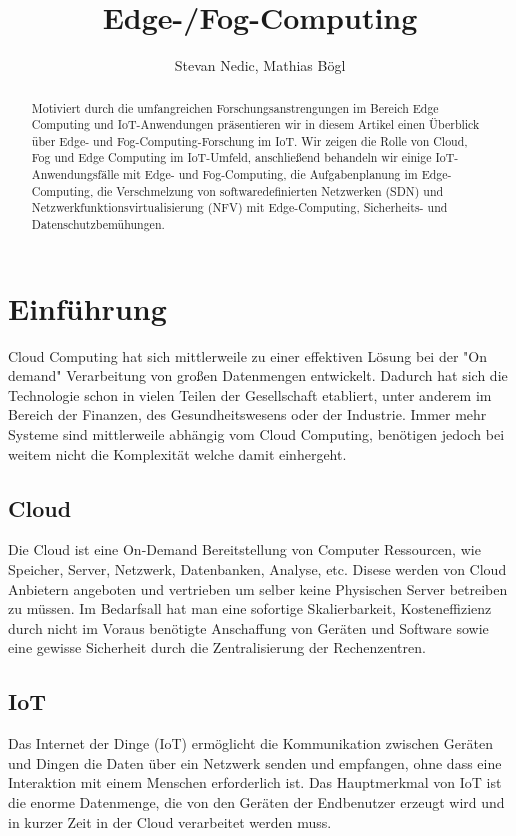 \documentclass[10pt, a4paper, twocolumn]{article}
\title{\textbf{Edge-/Fog-Computing}}
\author{Stevan Nedic, Mathias Bögl
}
\begin{document}
\maketitle

\begin{abstract}
	Motiviert durch die umfangreichen Forschungsanstrengungen im Bereich Edge Computing und IoT-Anwendungen präsentieren wir in diesem Artikel einen Überblick über Edge- und Fog-Computing-Forschung im IoT. Wir zeigen die Rolle von Cloud, Fog und Edge Computing im IoT-Umfeld, anschließend behandeln wir einige IoT-Anwendungsfälle mit Edge- und Fog-Computing, die Aufgabenplanung im Edge-Computing, die Verschmelzung von softwaredefinierten Netzwerken (SDN) und Netzwerkfunktionsvirtualisierung (NFV) mit Edge-Computing, Sicherheits- und Datenschutzbemühungen.
\end{abstract}


\section{Einführung}

Cloud Computing hat sich mittlerweile zu einer effektiven Lösung bei der "On demand" Verarbeitung von großen Datenmengen entwickelt. Dadurch hat sich die Technologie schon in vielen Teilen der Gesellschaft etabliert, unter anderem im Bereich der Finanzen, des Gesundheitswesens oder der Industrie. Immer mehr Systeme sind mittlerweile abhängig vom Cloud Computing, benötigen jedoch bei weitem nicht die Komplexität welche damit einhergeht.

\subsection{Cloud}
Die Cloud ist eine On-Demand Bereitstellung von Computer Ressourcen, wie Speicher, Server, Netzwerk, Datenbanken, Analyse, etc. Disese werden von Cloud Anbietern angeboten und vertrieben um selber keine Physischen Server betreiben zu müssen. Im Bedarfsall hat man eine sofortige Skalierbarkeit, Kosteneffizienz durch nicht im Voraus benötigte Anschaffung von Geräten und Software sowie eine gewisse Sicherheit durch die Zentralisierung der Rechenzentren.

\subsection{IoT}
Das Internet der Dinge (IoT) ermöglicht die Kommunikation zwischen Geräten und Dingen die Daten über ein Netzwerk senden und empfangen, ohne dass eine Interaktion mit einem Menschen erforderlich ist. Das Hauptmerkmal von IoT ist die enorme Datenmenge, die von den Geräten der Endbenutzer erzeugt wird und in kurzer Zeit in der Cloud verarbeitet werden muss.
\end{document}
